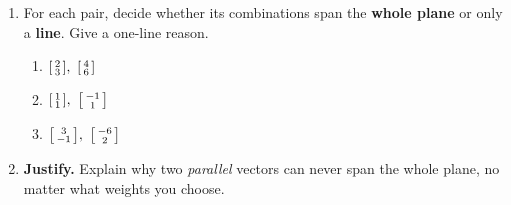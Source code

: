 \documentclass[10pt]{article}
\begin{document}
\begin{tcolorbox}[colback=white, colframe=black!40, title=\textbf{Tier E --- Extension},
    fonttitle=\bfseries, arc=1.5mm, left=3mm, right=3mm, top=2mm, bottom=2mm, breakable]
\begin{enumerate}[leftmargin=1.7em, itemsep=10pt]
  \item For each pair, decide whether its combinations span the \textbf{whole plane} or only a
        \textbf{line}. Give a one-line reason.
        \begin{enumerate}[label=(\alph*), leftmargin=1.8em, itemsep=4pt]
          \item $\begin{bsmallmatrix} 2 \\ 3 \end{bsmallmatrix},\ \begin{bsmallmatrix} 4 \\ 6 \end{bsmallmatrix}$ \hfill
          \item $\begin{bsmallmatrix} 1 \\ 1 \end{bsmallmatrix},\ \begin{bsmallmatrix} -1 \\ 1 \end{bsmallmatrix}$ \hfill
          \item $\begin{bsmallmatrix} 3 \\ -1 \end{bsmallmatrix},\ \begin{bsmallmatrix} -6 \\ 2 \end{bsmallmatrix}$
        \end{enumerate}
  \item \textbf{Justify.} Explain why two \emph{parallel} vectors can never span the whole
        plane, no matter what weights you choose. 
\end{enumerate}
\end{tcolorbox}
\end{document}
